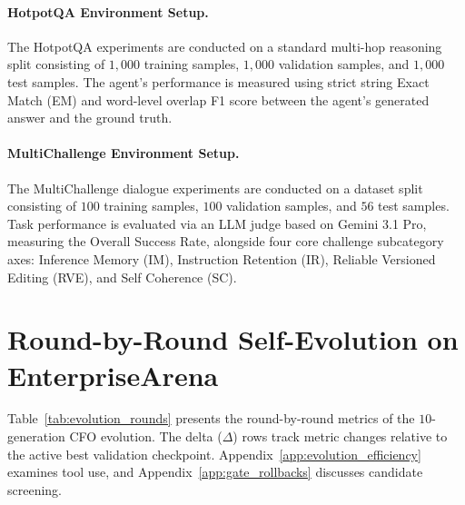 \paragraph{HotpotQA Environment Setup.}
The HotpotQA experiments are conducted on a standard multi-hop reasoning split consisting of $1,000$ training samples, $1,000$ validation samples, and $1,000$ test samples. The agent's performance is measured using strict string Exact Match (EM) and word-level overlap F1 score between the agent's generated answer and the ground truth.
\paragraph{MultiChallenge Environment Setup.}
The MultiChallenge dialogue experiments are conducted on a dataset split consisting of $100$ training samples, $100$ validation samples, and $56$ test samples. Task performance is evaluated via an LLM judge based on Gemini 3.1 Pro, measuring the Overall Success Rate, alongside four core challenge subcategory axes: Inference Memory (IM), Instruction Retention (IR), Reliable Versioned Editing (RVE), and Self Coherence (SC).

\section{Round-by-Round Self-Evolution on EnterpriseArena}
\label{app:self_evolution}

Table~\ref{tab:evolution_rounds} presents the round-by-round metrics of the $10$-generation CFO evolution. The delta ($\Delta$) rows track metric changes relative to the active best validation checkpoint. Appendix~\ref{app:evolution_efficiency} examines tool use, and Appendix~\ref{app:gate_rollbacks} discusses candidate screening.

